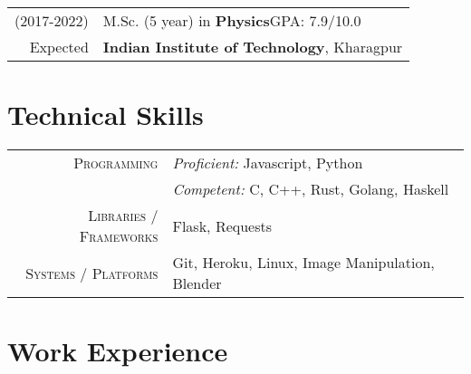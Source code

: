 \documentclass[a4paper,12pt]{extarticle} %
\let\oldtextbf\textbf
\renewcommand{\textbf}[1]{\textcolor{bold}{\oldtextbf{#1}}}
\begin{document}
\begin{tabular}{r|p{15.7cm}}
\textsc{(2017-2022)} & M.Sc. (5 year) in \textbf{Physics}\hfill\textsc{GPA}: 7.9/10.0\\
Expected &\textbf{Indian Institute of Technology}, Kharagpur\\
\end{tabular}


\vspace{0.5cm}



\section{\textcolor{primary}{Technical Skills}}

\begin{tabular}{r|p{13cm}}
\textsc{Programming} & \textit{Proficient:} Javascript, Python\\
& \textit{Competent:} C, C++, Rust, Golang, Haskell \\
\textsc{Libraries / Frameworks} & Flask, Requests\\
\textsc{Systems / Platforms} & Git, Heroku, Linux, Image Manipulation, Blender\\
\end{tabular}

\vspace{0.25cm}




\section{\textcolor{primary}{Work Experience}}
\end{document}
